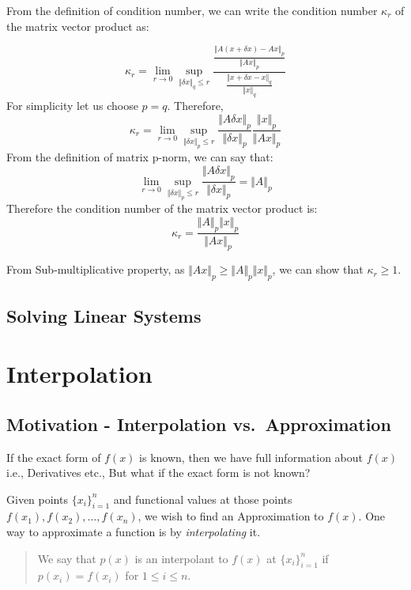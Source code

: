 \documentclass[
]{book}
\begin{document}
From the definition of condition number, we can write the condition number \(\kappa_r\) of the matrix vector product as:

\[\kappa_r = \lim_{r\to 0} \sup_{\Vert \delta x \Vert_q\le r} \dfrac{\frac{\Vert A(x+\delta x)-Ax \Vert_p}{\Vert Ax \Vert_p}}{\frac{\Vert x+\delta x-x\Vert_q}{\Vert x\Vert_q}}\]
For simplicity let us choose \(p=q\). Therefore,
\[\kappa_r = \lim_{r\to 0} \sup_{\Vert \delta x \Vert_p\le r} \frac{\Vert A\delta x \Vert_p}{\Vert \delta x \Vert_p} \frac{\Vert x \Vert_p}{\Vert Ax\Vert_p}\]
From the definition of matrix p-norm, we can say that: \[\lim_{r\to 0} \sup_{\Vert \delta x \Vert_p\le r} \frac{\Vert A\delta x \Vert_p}{\Vert \delta x \Vert_p} = \Vert A\Vert_p\]
Therefore the condition number of the matrix vector product is:
\begin{equation}
\kappa_r =  \frac{\Vert A \Vert_p \Vert x \Vert_p}{\Vert Ax\Vert_p}
\end{equation}

From Sub-multiplicative property, as \(\Vert Ax\Vert_p \ge\Vert A \Vert_p \Vert x \Vert_p\), we can show that \(\kappa_r\ge 1\).

\hypertarget{solving-linear-systems}{%
\section{Solving Linear Systems}\label{solving-linear-systems}}

\hypertarget{interpolation}{%
\chapter{Interpolation}\label{interpolation}}

\hypertarget{motivation---interpolation-vs.-approximation}{%
\section{Motivation - Interpolation vs.~Approximation}\label{motivation---interpolation-vs.-approximation}}

If the exact form of \(f(x)\) is known, then we have full information about \(f(x)\) i.e., Derivatives etc., But what if the exact form is not known?

Given points \(\{x_i\}_{i=1}^n\) and functional values at those points \(f(x_1),f(x_2), \dots, f(x_n)\), we wish to find an Approximation to \(f(x)\). One way to approximate a function is by \emph{interpolating} it.

\begin{quote}
We say that \(p(x)\) is an interpolant to \(f(x)\) at \(\{x_i\}_{i=1}^n\) if \(p(x_i)= f(x_i)\) for \(1\le i\le n\).
\end{quote}
\end{document}
